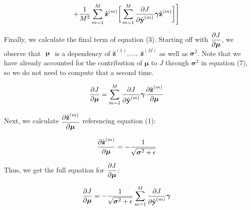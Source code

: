 \documentclass{article}
\begin{document}
\begin{multicols*}{2}
\begin{equation}
    +{1 \over M^2} \sum_{m=1}^M \hat{\textbf{z}}^{(m)}
        \bigg[
        \sum_{m = 1}^M {\partial J \over \partial \hat{\textbf{y}}^{(m)}} 
        \boldsymbol{\gamma}
        \hat{\textbf{z}}^{(m)}\bigg]\Bigg]
\end{equation}

Finally, we calculate the final term of equation (3). Starting off
with $\begin{aligned}
    {\partial J \over \partial \boldsymbol{\mu}}
\end{aligned}$, we observe that $\begin{aligned}
    \boldsymbol{\mu} 
\end{aligned}$ is a dependency of $\hat{\textbf{z}}^{(1)},...,\ \hat{\textbf{z}}^{(M)}$
as well as $\boldsymbol{\sigma}^2$. Note that we have already accounted for
the contribution of $\boldsymbol{\mu}$ to $J$ through $\boldsymbol{\sigma}^2$
in equation (7), so we do not need to compute that a second time.

\begin{equation}
    {\partial J \over \partial \boldsymbol{\mu}} = 
    \sum_{m=1}^M {\partial J \over \partial \hat{\textbf{y}}^{(m)}}
    \boldsymbol{\gamma}
    {\partial \hat{\textbf{z}}^{(m)} \over \partial \boldsymbol{\mu}} \notag
\end{equation}

Next, we calculate $\begin{aligned}
    {\partial \hat{\textbf{z}}^{(m)} \over \partial \boldsymbol{\mu}} 
\end{aligned}$ referencing equation (1):

\begin{equation}
    {\partial \hat{\textbf{z}}^{(m)} \over \partial \boldsymbol{\mu}} = 
    -{1 \over \sqrt{\boldsymbol{\sigma}^2 + \epsilon}} \notag
\end{equation}

Thus, we get the full equation for $\begin{aligned}
    {\partial J \over \partial \boldsymbol{\mu}}
\end{aligned}$:

\begin{equation}
    {\partial J \over \partial \boldsymbol{\mu}} = 
    -{1 \over \sqrt{\boldsymbol{\sigma}^2 + \epsilon}}
    \sum_{m=1}^M {\partial J \over \partial \hat{\textbf{y}}^{(m)}}
    \boldsymbol{\gamma} \notag
\end{equation}


\end{multicols*}
\end{document}
